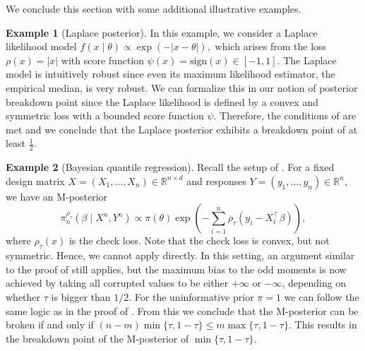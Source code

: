 \documentclass[11pt, oneside]{amsart}
\theoremstyle{definition}   %
\newtheorem{example}{Example}
\newcommand{\R}{\mathbb{R}}
\newcommand{\loss}{\rho}
\begin{document}
We conclude this section with some additional illustrative examples.
%
\begin{example}[Laplace posterior]
In this example, we consider a Laplace  likelihood model
%
\(
    f(x\mid \theta) \propto \exp (-|x-\theta|),
\)
%
which arises from the 
loss
%
\(
    \loss(x)=|x|
\)
%
with score function
%
$\psi(x)= \mathrm{sign}(x)\in[-1,1].$
%
The Laplace model is intuitively robust since even its maximum likelihood estimator, the empirical median, is very robust. We can formalize this in our notion of posterior breakdown point since the Laplace likelihood is defined by a  convex and symmetric loss with a bounded score function $\psi$. Therefore, the conditions of  are met and we conclude that the Laplace posterior exhibits a breakdown point of at least \( \tfrac{1}{2} \).
\end{example}
%
%
\begin{example}[Bayesian quantile regression]
\label{example::qr‐regression‐bp}
    Recall the setup of .
    For a fixed design matrix $X=(X_{1},\dots,X_{n})\in\R^{n\times d}$ and responses $Y=(y_{1},\dots,y_{n})\in\R^n$, we have
    an M-posterior
    \begin{equation*}
        \pi_n^{\loss_\tau} (\beta \mid X^n, Y^n) \propto
        \pi(\theta) \exp \left ( - \sum_{i=1}^n \loss_\tau (y_i - X_i^\top \beta)  \right ),
    \end{equation*}
    where \( \loss_\tau(x)\) is the check loss. Note that the check loss is convex, but not symmetric. Hence, we cannot apply  directly. In this setting, an argument similar to the proof of  still applies, but the maximum bias to the odd moments is now achieved by taking all corrupted values to be either \( +\infty\) or \( -\infty\), depending on whether \( \tau \) is bigger than \( 1/2\). For the uninformative prior \( \pi = 1\) we can follow the same logic as in the proof of . From this we conclude that the M-posterior can be broken if and only if
    \(
        (n-m) \min\{ \tau, 1-\tau \} \leq m \max \{\tau, 1-\tau\}.
    \)
    This results in the breakdown point of the M-posterior of \( \min\{ \tau, 1 - \tau\}.\)
\end{example}
%
%
\end{document}
